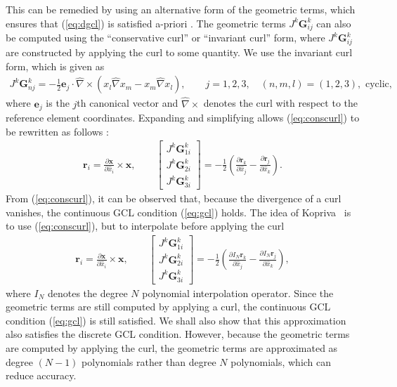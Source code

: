 \documentclass[preprint,10pt]{article}
\theoremstyle{definition}
\theoremstyle{lemma}
\theoremstyle{theorem}
\theoremstyle{assumption}
\renewcommand{\hat}{\widehat}
\newcommand{\pd}[2]{\frac{\partial#1}{\partial#2}}
\newcommand{\LRp}[1]{\left( #1 \right)}
\newcommand{\LRs}[1]{\left[ #1 \right]}
\newcommand{\Grad} {\ensuremath{\nabla}}
\begin{document}
{This can be remedied by using an alternative form of the geometric terms, which ensures that (\ref{eq:dgcl}) is satisfied a-priori \cite{visbal2002use, kopriva2006metric}.  The geometric terms $J^k\bm{G}^k_{ij}$ can also be computed using the ``conservative curl'' or ``invariant curl'' form, where $J^k\bm{G}^k_{ij}$ are constructed by applying the curl to some quantity.  We use the invariant curl form, which is given as
\begin{align}
J^k\bm{G}^k_{nj} = -\frac{1}{2}\bm{e}_j\cdot \hat{\Grad} \times \LRp{x_l\hat{\Grad}x_m - x_m\hat{\Grad}x_l}, \qquad j = 1,2,3, \quad (n,m,l) = (1,2,3), \text{ cyclic},
\label{eq:conscurl}
\end{align}
where $\bm{e}_j$ is the $j$th canonical vector and $\hat{\Grad} \times $ denotes the curl with respect to the reference element coordinates.  Expanding and simplifying allows (\ref{eq:conscurl}) to be rewritten as follows \cite{hindenlang2012explicit}:
\begin{align}
\bm{r}_i = \pd{\bm{x}}{\hat{x}_i}\times \bm{x}, \qquad
\LRs{\begin{array}{c}
J^k\bm{G}^k_{1i}\\
J^k\bm{G}^k_{2i}\\
J^k\bm{G}^k_{3i}\end{array}} = -\frac{1}{2}\LRp{\pd{\bm{r}_k}{\hat{x}_j}-\pd{\bm{r}_j}{\hat{x}_k}}.
\end{align}
From (\ref{eq:conscurl}), it can be observed that, because the divergence of a curl vanishes, the continuous GCL condition (\ref{eq:gcl}) holds.  
The idea of Kopriva~\cite{kopriva2006metric} is to use (\ref{eq:conscurl}), but to interpolate before applying the curl  %
\begin{align}
\bm{r}_i = { \pd{\bm{x}}{\hat{x}_i}\times \bm{x}}, \qquad
\LRs{\begin{array}{c}
J^k\bm{G}^k_{1i}\\
J^k\bm{G}^k_{2i}\\
J^k\bm{G}^k_{3i}\end{array}} = -\frac{1}{2}\LRp{\pd{I_N\bm{r}_k}{\hat{x}_j}-\pd{I_N\bm{r}_j}{\hat{x}_k}}, 
\label{eq:iconscurl}
\end{align}
where $I_N$ denotes the degree $N$ polynomial interpolation operator. Since the geometric terms are still computed by applying a curl, the continuous GCL condition (\ref{eq:gcl}) is still satisfied. We shall also show that this approximation also satisfies the discrete GCL condition. However, because the geometric terms are computed by applying the curl, the geometric terms are approximated as degree $(N-1)$ polynomials rather than degree $N$ polynomials, which can reduce accuracy.  

}
\end{document}
